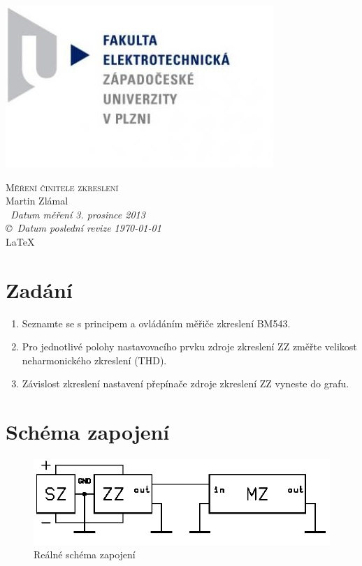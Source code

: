 \documentclass[12pt]{article} %
\begin{document}
\begin{titlepage}
	\includegraphics[scale=0.7]{logo.jpg}
	\vspace*{\fill}
	\begin{center}
		\textsc{\LARGE Měření činitele zkreslení}\\[1cm]
		Martin Zlámal \\[1cm]
		{\small\em \ Datum měření 3. prosince 2013 } \\
		{\small\em \copyright \ Datum poslední revize \today } \\
		\LaTeX
	\end{center}
	\vspace*{\fill}
\end{titlepage}
\newpage

\section{Zadání}
\begin{enumerate}
\item Seznamte se s principem a ovládáním měřiče zkreslení BM543.
\item Pro jednotlivé polohy nastavovacího prvku zdroje zkreslení ZZ změřte velikost
neharmonického zkreslení (THD).
\item Závislost zkreslení nastavení přepínače zdroje zkreslení ZZ vyneste do grafu.
\end{enumerate}

\section{Schéma zapojení}
\begin{figure}[H]
\center
\includegraphics[scale=0.6]{schema.png}
\caption{Reálné schéma zapojení}
\end{figure}
\end{document}
